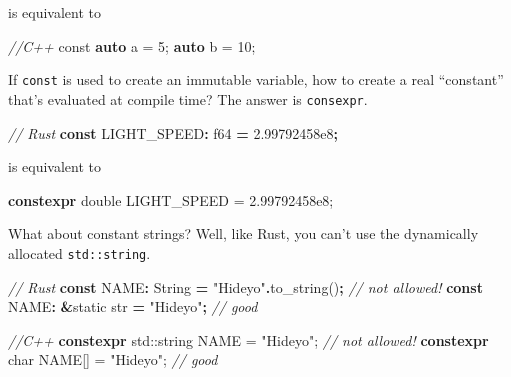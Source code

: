 \documentclass[
]{book}
\newenvironment{Shaded}{\begin{snugshade}}{\end{snugshade}}
\newcommand{\AttributeTok}[1]{\textcolor[rgb]{0.77,0.63,0.00}{#1}}
\newcommand{\BuiltInTok}[1]{#1}
\newcommand{\CommentTok}[1]{\textcolor[rgb]{0.56,0.35,0.01}{\textit{#1}}}
\newcommand{\DataTypeTok}[1]{\textcolor[rgb]{0.13,0.29,0.53}{#1}}
\newcommand{\DecValTok}[1]{\textcolor[rgb]{0.00,0.00,0.81}{#1}}
\newcommand{\FloatTok}[1]{\textcolor[rgb]{0.00,0.00,0.81}{#1}}
\newcommand{\KeywordTok}[1]{\textcolor[rgb]{0.13,0.29,0.53}{\textbf{#1}}}
\newcommand{\NormalTok}[1]{#1}
\newcommand{\OperatorTok}[1]{\textcolor[rgb]{0.81,0.36,0.00}{\textbf{#1}}}
\newcommand{\OtherTok}[1]{\textcolor[rgb]{0.56,0.35,0.01}{#1}}
\newcommand{\StringTok}[1]{\textcolor[rgb]{0.31,0.60,0.02}{#1}}
\begin{document}
is equivalent to

\begin{Shaded}
\begin{Highlighting}[]
\CommentTok{//C++}
\AttributeTok{const} \KeywordTok{auto}\NormalTok{ a = }\DecValTok{5}\NormalTok{;}
\KeywordTok{auto}\NormalTok{ b = }\DecValTok{10}\NormalTok{;}
\end{Highlighting}
\end{Shaded}

If \texttt{const} is used to create an immutable variable, how to create a real ``constant'' that's evaluated at compile time? The answer is \texttt{consexpr}.

\begin{Shaded}
\begin{Highlighting}[]
\CommentTok{// Rust}
\KeywordTok{const}\NormalTok{ LIGHT\_SPEED}\OperatorTok{:} \DataTypeTok{f64} \OperatorTok{=} \DecValTok{2.99792458e8}\OperatorTok{;}
\end{Highlighting}
\end{Shaded}

is equivalent to

\begin{Shaded}
\begin{Highlighting}[]
\KeywordTok{constexpr} \DataTypeTok{double}\NormalTok{ LIGHT\_SPEED = }\FloatTok{2.99792458e8}\NormalTok{;}
\end{Highlighting}
\end{Shaded}

What about constant strings? Well, like Rust, you can't use the dynamically allocated \texttt{std::string}.

\begin{Shaded}
\begin{Highlighting}[]
\CommentTok{// Rust}
\KeywordTok{const}\NormalTok{ NAME}\OperatorTok{:} \DataTypeTok{String} \OperatorTok{=} \StringTok{"Hideyo"}\OperatorTok{.}\NormalTok{to\_string()}\OperatorTok{;} \CommentTok{// not allowed!}
\KeywordTok{const}\NormalTok{ NAME}\OperatorTok{:} \OperatorTok{\&}\OtherTok{\textquotesingle{}static} \DataTypeTok{str} \OperatorTok{=} \StringTok{"Hideyo"}\OperatorTok{;}       \CommentTok{// good}
\end{Highlighting}
\end{Shaded}

\begin{Shaded}
\begin{Highlighting}[]
\CommentTok{//C++}
\KeywordTok{constexpr} \BuiltInTok{std::}\NormalTok{string NAME = }\StringTok{"Hideyo"}\NormalTok{; }\CommentTok{// not allowed!}
\KeywordTok{constexpr} \DataTypeTok{char}\NormalTok{ NAME[] = }\StringTok{"Hideyo"}\NormalTok{;      }\CommentTok{// good}
\end{Highlighting}
\end{Shaded}
\end{document}
